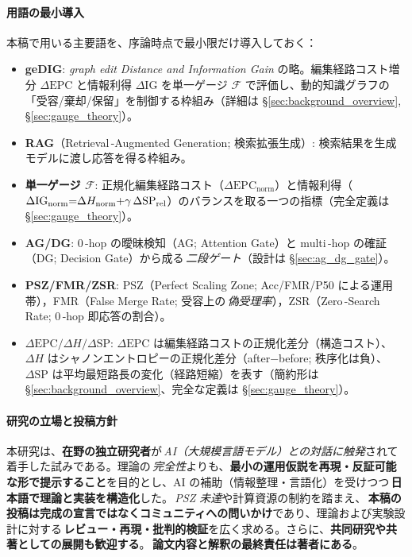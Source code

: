 \documentclass[ja=standard,xelatex]{bxjsarticle}
\newcommand{\F}{\mathcal{F}}
\newcommand{\gednorm}{\Delta\mathrm{EPC}_{\mathrm{norm}}}
\newcommand{\ignorm}{\Delta\mathrm{IG}_{\mathrm{norm}}}
\begin{document}
\paragraph{用語の最小導入}
本稿で用いる主要語を、序論時点で最小限だけ導入しておく：
\begin{itemize}[leftmargin=1.6em]
  \item \textbf{geDIG}: \textit{graph edit Distance and Information Gain} の略。編集経路コスト増分 $\Delta\mathrm{EPC}$ と情報利得 $\Delta\mathrm{IG}$ を単一ゲージ $\F$ で評価し、動的知識グラフの「受容/棄却/保留」を制御する枠組み（詳細は \S\ref{sec:background_overview}, \S\ref{sec:gauge_theory}）。
  \item \textbf{RAG}（Retrieval\,\mbox{-}Augmented Generation; 検索拡張生成）: 検索結果を生成モデルに渡し応答を得る枠組み。
  \item \textbf{単一ゲージ $\F$}: 正規化編集経路コスト（$\gednorm$）と情報利得（$\ignorm{=}\Delta H_{\rm norm}{+}\gamma\,\Delta\mathrm{SP}_{\rm rel}$）のバランスを取る一つの指標（完全定義は \S\ref{sec:gauge_theory}）。
  \item \textbf{AG/DG}: 0\,\mbox{-}hop の曖昧検知（AG; Attention Gate）と multi\,\mbox{-}hop の確証（DG; Decision Gate）から成る\,\emph{二段ゲート}（設計は \S\ref{sec:ag_dg_gate}）。
  \item \textbf{PSZ/FMR/ZSR}: PSZ（Perfect Scaling Zone; Acc/FMR/P50 による運用帯），FMR（False Merge Rate; 受容上の\,\emph{偽受理率}），ZSR（Zero\,\mbox{-}Search Rate; 0\,\mbox{-}hop 即応答の割合）。
  \item \textbf{$\Delta\mathrm{EPC}/\Delta H/\Delta\mathrm{SP}$}: $\Delta\mathrm{EPC}$ は編集経路コストの正規化差分（構造コスト）、$\Delta H$ はシャノンエントロピーの正規化差分（after−before; 秩序化は負）、$\Delta\mathrm{SP}$ は平均最短路長の変化（経路短縮）を表す（簡約形は \S\ref{sec:background_overview}、完全な定義は \S\ref{sec:gauge_theory}）。
\end{itemize}

\paragraph{研究の立場と投稿方針}
本研究は、\textbf{在野の独立研究者}が\,\emph{AI（大規模言語モデル）との対話に触発}されて着手した試みである。理論の\,\emph{完全性}よりも、\textbf{最小の運用仮説を再現・反証可能な形で提示すること}を目的とし、AI の補助（情報整理・言語化）を受けつつ\,\textbf{日本語で理論と実装を構造化}した。\,\emph{PSZ 未達}や計算資源の制約を踏まえ、\,\textbf{本稿の投稿は完成の宣言ではなくコミュニティへの問いかけ}であり、理論および実験設計に対する\,\textbf{レビュー・再現・批判的検証}を広く求める。さらに、\textbf{共同研究や共著としての展開も歓迎する}。\,\textbf{論文内容と解釈の最終責任は著者にある}。
\end{document}
